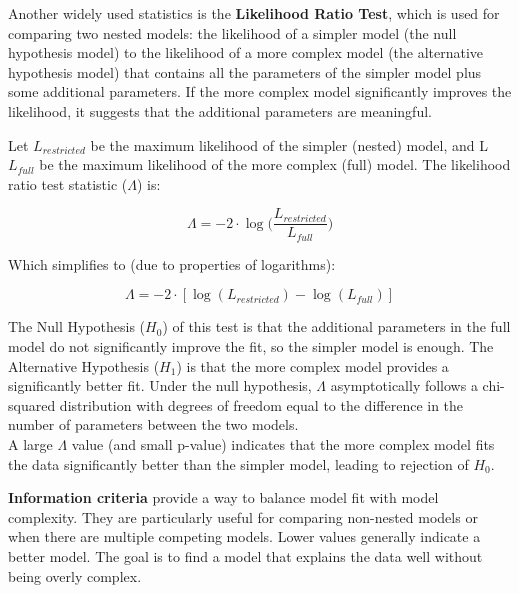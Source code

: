 \documentclass[
  letterpaper,
  DIV=11,
  numbers=noendperiod]{scrartcl}
\begin{document}
Another widely used statistics is the \textbf{Likelihood Ratio Test},
which is used for comparing two nested models: the likelihood of a
simpler model (the null hypothesis model) to the likelihood of a more
complex model (the alternative hypothesis model) that contains all the
parameters of the simpler model plus some additional parameters. If the
more complex model significantly improves the likelihood, it suggests
that the additional parameters are meaningful.

Let \(L_{restricted}\) be the maximum likelihood of the simpler (nested)
model, and L \(L_{full}\) be the maximum likelihood of the more complex
(full) model. The likelihood ratio test statistic (\(\Lambda\)) is:

\[
\Lambda = - 2 \cdot \log \Bigg(\frac{L_{restricted}}{L_{full}}\Bigg)
\]

Which simplifies to (due to properties of logarithms):

\[
\Lambda = -2 \cdot [\log(L_{restricted})-\log(L_{full})]
\]

The Null Hypothesis (\(H_0\)) of this test is that the additional
parameters in the full model do not significantly improve the fit, so
the simpler model is enough. The Alternative Hypothesis (\(H_1\)) is
that the more complex model provides a significantly better fit. Under
the null hypothesis, \(\Lambda\) asymptotically follows a chi-squared
distribution with degrees of freedom equal to the difference in the
number of parameters between the two models.\\
A large \(\Lambda\) value (and small p-value) indicates that the more
complex model fits the data significantly better than the simpler model,
leading to rejection of \(H_0\).

\textbf{Information criteria} provide a way to balance model fit with
model complexity. They are particularly useful for comparing non-nested
models or when there are multiple competing models. Lower values
generally indicate a better model. The goal is to find a model that
explains the data well without being overly complex.
\end{document}
